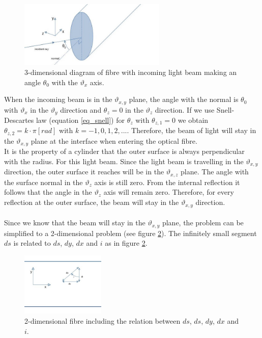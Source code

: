 \documentclass{article}
\begin{document}
\begin{figure}[h!]
	\centering
	\includegraphics[width=7cm]{afbeeldingen/fibre_3d.jpg}
	\caption{3-dimensional diagram of fibre with incoming light beam making an angle $\theta _0$ with the $\vartheta _x$ axis.}
	\label{fig_fibre_3d}
\end{figure}
When the incoming beam is in the $\vartheta _{x,y}$ plane, the angle with the normal is $\theta _0$ with $\vartheta _x$ in the $\vartheta _y$ direction and $\theta _z = 0$ in the $\vartheta _z$ direction. If we use Snell-Descartes law (equation \ref{eq_snell}) for $\theta _z$ with $\theta _{z,1} = 0$ we obtain $\theta _{z,2} = k \cdot \pi [rad]$ with $k = -1,0,1,2,...$. Therefore, the beam of light will stay in the $\vartheta _{x,y}$ plane at the interface when entering the optical fibre. \\
It is the property of a cylinder that the outer surface is always perpendicular with the radius. For this light beam. Since the light beam is travelling in the $\vartheta _{x,y}$ direction, the outer surface it reaches will be in the $\vartheta _{x,z}$ plane. The angle with the surface normal in the $\vartheta _z$ axis is still zero. From the internal reflection it follows that the angle in  the $\vartheta _z$ axis will remain zero. Therefore, for every reflection at the outer surface, the beam will stay in the $\vartheta _{x,y}$ direction.\\
\\
Since we know that the beam will stay in the $\vartheta _{x,y}$ plane, the problem can  be simplified to a 2-dimensional problem (see figure \ref{fig_fibre_2d}). The infinitely small segment $ds$ is related to $ds$, $dy$, $dx$ and $i$ as in figure \ref{fig_fibre_2d}.


\begin{figure}[h!]
	\centering
	\includegraphics[width = 4cm]{afbeeldingen/fibre_2d.jpg}
	\caption{2-dimensional fibre including the relation between $ds$, $ds$, $dy$, $dx$ and $i$.}
	\label{fig_fibre_2d}
\end{figure}
\end{document}
